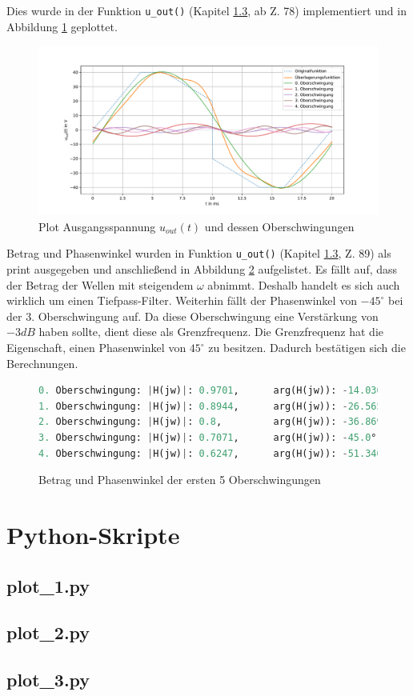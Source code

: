 \documentclass[11pt]{scrartcl}
\begin{document}
Dies wurde in der Funktion \lstinline{u_out()} (Kapitel \ref{sec:plot_3}, ab Z. 78) implementiert und in Abbildung \ref{fig:plot_3} geplottet.
\begin{figure}[!htb]
    \begin{center}
      \includegraphics[width=1.1\linewidth]{./Figures/plot_3.pdf}
    \caption{Plot Ausgangsspannung $u_{out}(t)$ und dessen Oberschwingungen}
    \label{fig:plot_3}
  \end{center}
\end{figure}

Betrag und Phasenwinkel wurden in Funktion \lstinline{u_out()} (Kapitel \ref{sec:plot_3}, Z. 89) als print ausgegeben und anschließend in Abbildung \ref{fig:bet-phas} aufgelistet. Es fällt auf, dass der Betrag der Wellen mit steigendem $\omega$ abnimmt. Deshalb handelt es sich auch wirklich um einen Tiefpass-Filter.
Weiterhin fällt der Phasenwinkel von $-45^{\circ}$ bei der 3. Oberschwingung auf. Da diese Oberschwingung eine Verstärkung von $-3 \unit{dB}$ haben sollte, dient diese als Grenzfrequenz.
Die Grenzfrequenz hat die Eigenschaft, einen Phasenwinkel von $45^{\circ}$ zu besitzen. Dadurch bestätigen sich die Berechnungen.
\begin{figure}[!htb]
  \centering
\begin{lstlisting}[language=Python]
0. Oberschwingung: |H(jw)|: 0.9701,      arg(H(jw)): -14.0362°
1. Oberschwingung: |H(jw)|: 0.8944,      arg(H(jw)): -26.5651°
2. Oberschwingung: |H(jw)|: 0.8,         arg(H(jw)): -36.8699°
3. Oberschwingung: |H(jw)|: 0.7071,      arg(H(jw)): -45.0°
4. Oberschwingung: |H(jw)|: 0.6247,      arg(H(jw)): -51.3402°
\end{lstlisting}
\caption{Betrag und Phasenwinkel der ersten 5 Oberschwingungen}
\label{fig:bet-phas}
\end{figure}

\section{Python-Skripte}
\subsection{plot\_1.py}\label{sec:plot_1}

\subsection{plot\_2.py}

\subsection{plot\_3.py}\label{sec:plot_3}

\end{document}
